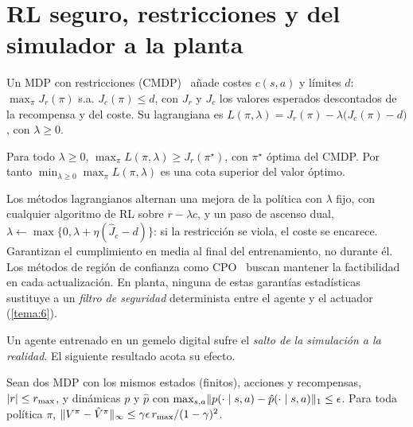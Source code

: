 \section{RL seguro, restricciones y del simulador a la planta}

\begin{definicion}\label{def:cmdp}
Un MDP con restricciones (CMDP)~\cite{altman} añade costes $c(s,a)$ y límites $d$: $\max_\pi J_r(\pi)$ s.a. $J_c(\pi)\le d$, con $J_r$ y $J_c$ los valores esperados descontados de la recompensa y del coste. Su lagrangiana es $L(\pi,\lambda)=J_r(\pi)-\lambda\bigl(J_c(\pi)-d\bigr)$, con $\lambda\ge0$.
\end{definicion}

\begin{proposicion}\label{prop:dual}
Para todo $\lambda\ge0$, $\max_\pi L(\pi,\lambda)\ge J_r(\pi^{\star})$, con $\pi^{\star}$ óptima del CMDP. Por tanto $\min_{\lambda\ge0}\max_\pi L(\pi,\lambda)$ es una cota superior del valor óptimo.
\end{proposicion}

Los métodos lagrangianos alternan una mejora de la política con $\lambda$ fijo, con cualquier algoritmo de RL sobre $r-\lambda c$, y un paso de ascenso dual, $\lambda\leftarrow\max\{0,\lambda+\eta(\hat J_c-d)\}$: si la restricción se viola, el coste se encarece. Garantizan el cumplimiento en media al final del entrenamiento, no durante él. Los métodos de región de confianza como CPO~\cite{cpo} buscan mantener la factibilidad en cada actualización. En planta, ninguna de estas garantías estadísticas sustituye a un \emph{filtro de seguridad} determinista entre el agente y el actuador (\cref{tema:6}).

Un agente entrenado en un gemelo digital sufre el \emph{salto de la simulación a la realidad}. El siguiente resultado acota su efecto.

\begin{teorema}\label{teo:simlema}
Sean dos MDP con los mismos estados (finitos), acciones y recompensas, $\lvert r\rvert\le r_{\max}$, y dinámicas $p$ y $\hat p$ con $\max_{s,a}\lVert p(\cdot\mid s,a)-\hat p(\cdot\mid s,a)\rVert_1\le\epsilon$. Para toda política $\pi$, $\lVert V^{\pi}-\hat V^{\pi}\rVert_\infty\le\gamma\epsilon\,r_{\max}/(1-\gamma)^{2}$.
\end{teorema}

